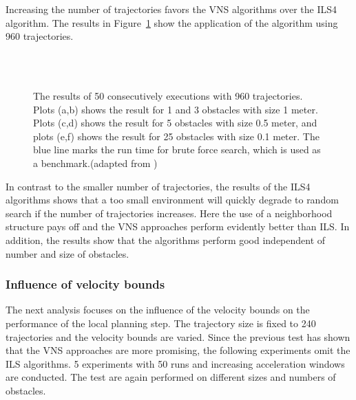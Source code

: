 Increasing the number of trajectories favors the VNS algorithms over the ILS4 algorithm. The results in Figure~\ref{fig:fig_special_960} show the application of the algorithm using 960 trajectories.

\begin{figure}[thpb]
   \myfloatalign
    \tiny
          \centering
    \\
    \\
    \caption[Experiment: Specific instances with 960 trajectories]{The results of 50 consecutively executions with 960 trajectories. Plots (a,b) shows the result for 1 and 3 obstacles with size 1 meter. Plots (c,d) shows the result for 5 obstacles with size 0.5 meter, and plots (e,f) shows the result for 25 obstacles with size 0.1 meter. The blue line marks the run time for brute force search, which is used as a benchmark.(adapted from \cite{myself})}  
     \label{fig:fig_special_960}
\end{figure}
   
In contrast to the smaller number of trajectories, the results of the ILS4 algorithms shows that a too small environment will quickly degrade to random search if the number of trajectories increases. 
Here the use of a neighborhood structure pays off and the VNS approaches perform evidently better than ILS. 
In addition, the results show that the algorithms perform good independent of number and size of obstacles.

\subsubsection{Influence of velocity bounds}
The next analysis focuses on the influence of the velocity bounds on the performance of the local planning step. 
The trajectory size is fixed to 240 trajectories and the velocity bounds are varied.
Since the previous test has shown that the VNS approaches are more promising, the following experiments omit the ILS algorithms.
5 experiments with 50 runs and increasing acceleration windows are conducted.
The test are again performed on different sizes and numbers of obstacles.

